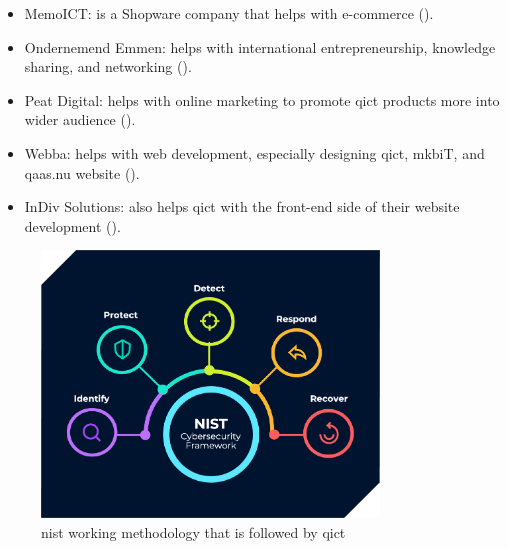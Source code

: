 \begin{multicols}{2}
      \begin{itemize}
            \item MemoICT: is a Shopware company that helps with e-commerce (\textit{\cite{memoICT}}).
            \item Ondernemend Emmen: helps with international entrepreneurship, knowledge sharing, and networking
                  (\textit{\cite{ondernemendEmmen}}).
            \item Peat Digital: helps with online marketing to promote \acrshort{qict} products more into wider audience
                  (\textit{\cite{peatDigital}}).
            \item Webba: helps with web development, especially designing \acrshort{qict}, \acrshort{mkb}iT, and \acrshort{qaas}.nu website
                  (\textit{\cite{webba}}).
            \item InDiv Solutions: also helps \acrshort{qict} with the front-end side of their website development
                  (\textit{\cite{indivSolution}}).
      \end{itemize}
\end{multicols}


\begin{figure}[htbp]
      \centering
      \includegraphics[width=0.8\textwidth]{Figures/qict-working-method.png}
      \caption{\acrshort{nist} working methodology that is followed by \acrshort{qict}}
\end{figure}

